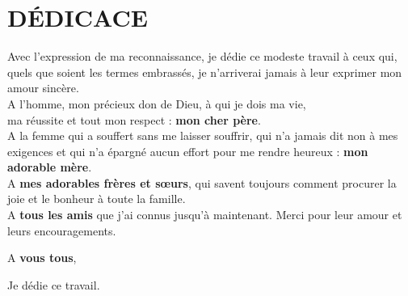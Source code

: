 \chapter*{DÉDICACE}
\thispagestyle{MyStyle}

\begin{center}
{\huge A}vec l'expression de ma reconnaissance, je dédie ce modeste travail à ceux qui, quels que soient les termes embrassés, je n'arriverai jamais à leur exprimer mon amour sincère.\\[1.5em]

{\huge A} l'homme, mon précieux don de Dieu, à qui je dois ma vie,\\ ma réussite et tout mon respect : \textbf{mon cher père}.\\[1em]

{\huge A} la femme qui a souffert sans me laisser souffrir, qui n'a jamais dit non à mes exigences et qui n'a épargné aucun effort pour me rendre heureux : \textbf{mon adorable mère}.\\[1.5em]

{\huge A} \textbf{mes adorables frères et sœurs}, qui savent toujours comment procurer la joie et le bonheur à toute la famille.\\[1.5em]

{\huge A} \textbf{tous les amis} que j'ai connus jusqu'à maintenant. Merci pour leur amour et leurs encouragements.\\[2em]
\end{center}

\raggedright\hspace{5.75cm} {\huge A} \textbf{vous tous},~\\
\raggedright\hspace{7.75cm} Je dédie ce travail\@.
